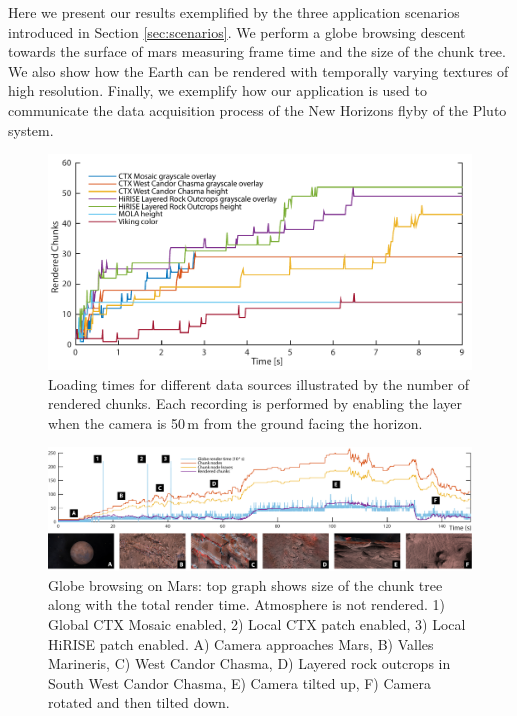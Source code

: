 \documentclass[journal]{vgtc}                %
\begin{document}
Here we present our results exemplified by the three application scenarios introduced in Section \ref{sec:scenarios}. We perform a globe browsing descent towards the surface of mars measuring frame time and the size of the chunk tree. We also show how the Earth can be rendered with temporally varying textures of high resolution. Finally, we exemplify how our application is used to communicate the data acquisition process of the New Horizons flyby of the Pluto system.

\begin{figure}[b!]
  \centering
    \includegraphics[width=1.0\linewidth]{figures/load_times.pdf}
  \caption{Loading times for different data sources illustrated by the number of rendered chunks. Each recording is performed by enabling the layer when the camera is 50\,m from the ground facing the horizon.}  %
  \label{fig:load-times}
\end{figure}


\begin{figure}
\includegraphics[width=\linewidth]{figures/marsbrowsing5_compressed.pdf}
\caption{Globe browsing on Mars: top graph shows size of the chunk tree along with the total render time. Atmosphere is not rendered. 1) Global CTX Mosaic enabled, 2) Local CTX patch enabled, 3) Local HiRISE patch enabled. A) Camera approaches Mars, B) Valles Marineris, C) West Candor Chasma, D) Layered rock outcrops in South West Candor Chasma, E) Camera tilted up, F) Camera rotated and then tilted down.}  \vspace{-2mm}
\label{fig:globebrowsingmars}
\end{figure}
\end{document}
